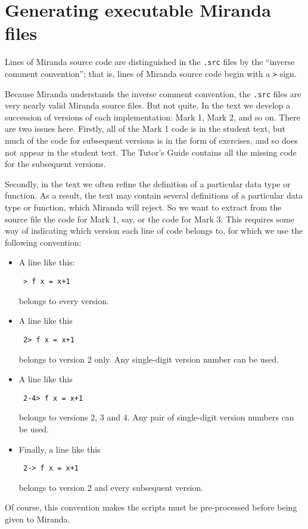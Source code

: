 \section{Generating executable Miranda files}

Lines of Miranda source code are distinguished in the \mbox{\tt .src} files
by the ``inverse comment convention''; that is, lines of Miranda source
code begin with a \mbox{\tt >} sign.

Because Miranda understands the inverse comment convention,
the \mbox{\tt .src} files are very nearly valid Miranda source files.  But not quite.
In the text we develop a succession of versions of each implementation:
Mark 1, Mark 2, and so on.
There are two issues here.  Firstly, all of the Mark 1 code is in the
student text, but much of the code for subsequent versions is in the form
of exercises, and so does not appear in the student text.  The Tutor's Guide
contains all the missing code for the subsequent versions.

Secondly,
in the text we often refine the definition of a particular data type
or function.  As a result, the text may contain several definitions
of a particular data type or function, which Miranda will reject.
So we want to extract from the source file
the code for Mark 1, say, or the code for Mark 3.
This requires some way of indicating which version each line of code
belongs to, for which we use the following convention:
\begin{itemize}
\item
A line like this:
\begin{verbatim}
 > f x = x+1
\end{verbatim}
belongs to every version.
\item
A line like this
\begin{verbatim}
 2> f x = x+1
\end{verbatim}
belongs to version 2 only.  Any single-digit version number can be used.
\item
A line like this
\begin{verbatim}
 2-4> f x = x+1
\end{verbatim}
belongs to versions 2, 3 and 4.  Any pair of single-digit version numbers can
be used.
\item
Finally, a line like this
\begin{verbatim}
 2-> f x = x+1
\end{verbatim}
belongs to version 2 and every subsequent version.
\end{itemize}
Of course, this convention makes the scripts must be pre-processed before
being given to Miranda.  

